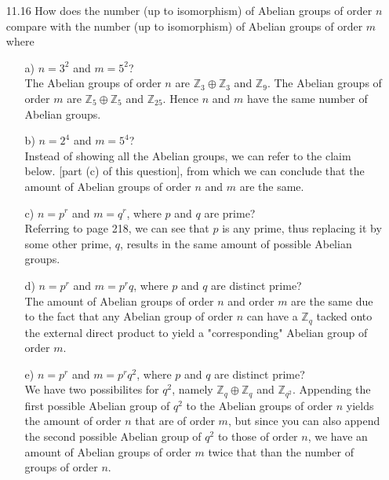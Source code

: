 \documentclass[12pt]{article}
\begin{document}
\begin{enumerate}
\item[11.16] How does the number (up to isomorphism) of Abelian groups of order $n$ compare with
the number (up to isomorphism) of Abelian groups of order $m$ where
\begin{enumerate}
\item[a)] $n = 3^2$ and $m = 5^2$? \\
The Abelian groups of order $n$ are $\mathbb{Z}_3 \oplus \mathbb{Z}_3$ and $\mathbb{Z}_9$. The
Abelian groups of order $m$ are $\mathbb{Z}_5 \oplus \mathbb{Z}_5$ and $\mathbb{Z}_{25}$. Hence $n$ and $m$
have the same number of Abelian groups.
\item[b)] $n = 2^4$ and $m = 5^4$? \\
Instead of showing all the Abelian groups, we can refer to the claim below. [part (c) of this question], 
from which we can conclude that the amount of Abelian groups of order $n$ and $m$ are the same.
\item[c)] $n = p^r$ and $m = q^r$, where $p$ and $q$ are prime? \\
Referring to page 218, we can see that $p$ is any prime, thus replacing it by some other prime, $q$, 
results in the same amount of possible Abelian groups.
\item[d)] $n = p^r$ and $m = p^rq$, where $p$ and $q$ are distinct prime? \\
The amount of Abelian groups of order $n$ and order $m$ are the same due to the fact that any Abelian group
of order $n$ can have a $\mathbb{Z}_q$ tacked onto the external direct product to yield a "corresponding" Abelian group
of order $m$.
\item[e)] $n = p^r$ and $m = p^rq^2$, where $p$ and $q$ are distinct prime? \\
We have two possibilites for $q^2$, namely $\mathbb{Z}_q \oplus \mathbb{Z}_q$ and $\mathbb{Z}_{q^2}$. Appending the
first possible Abelian group of $q^2$ to the Abelian groups of order $n$ yields the amount of order $n$ that are of order $m$, 
but since you can also append the second possible Abelian group of $q^2$ to those of order $n$, we have an amount of 
Abelian groups of order $m$ twice that than the number of groups of order $n$.
\end{enumerate}



\end{enumerate}
\end{document}
